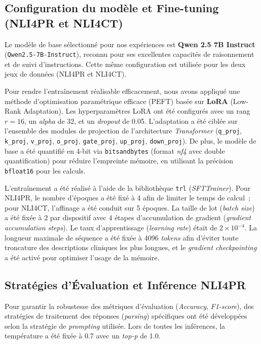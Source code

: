 \documentclass[10pt,twoside]{article}
\begin{document}
\subsection{Configuration du modèle et Fine-tuning (NLI4PR et NLI4CT)}
Le modèle de base sélectionné pour nos expériences est \textbf{Qwen 2.5 7B Instruct} (\texttt{Qwen2.5-7B-Instruct}), reconnu pour ses excellentes capacités de raisonnement et de suivi d'instructions. Cette même configuration est utilisée pour les deux jeux de données (NLI4PR et NLI4CT).

Pour rendre l'entraînement réalisable efficacement, nous avons appliqué une méthode d'optimisation paramétrique efficace (PEFT) basée sur \textbf{LoRA} (Low-Rank Adaptation). Les hyperparamètres LoRA ont été configurés avec un rang $r=16$, un \textit{alpha} de 32, et un \textit{dropout} de 0.05. L'adaptation a été ciblée sur l'ensemble des modules de projection de l'architecture \textit{Transformer} (\texttt{q\_proj}, \texttt{k\_proj}, \texttt{v\_proj}, \texttt{o\_proj}, \texttt{gate\_proj}, \texttt{up\_proj}, \texttt{down\_proj}). De plus, le modèle de base a été quantifié en 4-bit via \texttt{bitsandbytes} (format \textit{nf4} avec double quantification) pour réduire l'empreinte mémoire, en utilisant la précision \texttt{bfloat16} pour les calculs.

L'entraînement a été réalisé à l'aide de la bibliothèque \texttt{trl} (\textit{SFTTrainer}). Pour NLI4PR, le nombre d'époques a été fixé à 4 afin de limiter le temps de calcul~; pour NLI4CT, l'affinage a été conduit sur 5 époques. La taille de lot (\textit{batch size}) a été fixée à 2 par dispositif avec 4 étapes d'accumulation de gradient (\textit{gradient accumulation steps}). Le taux d'apprentissage (\textit{learning rate}) était de $2 \times 10^{-4}$. La longueur maximale de séquence a été fixée à 4096 \textit{tokens} afin d'éviter toute troncature des descriptions cliniques les plus longues, et le \textit{gradient checkpointing} a été activé pour optimiser l'usage de la mémoire.

\subsection{Stratégies d'Évaluation et Inférence NLI4PR}
Pour garantir la robustesse des métriques d'évaluation (\textit{Accuracy}, \textit{F1-score}), des stratégies de traitement des réponses (\textit{parsing}) spécifiques ont été développées selon la stratégie de \textit{prompting} utilisée. Lors de toutes les inférences, la température a été fixée à 0.7 avec un \textit{top-p} de 1.0.
\end{document}
